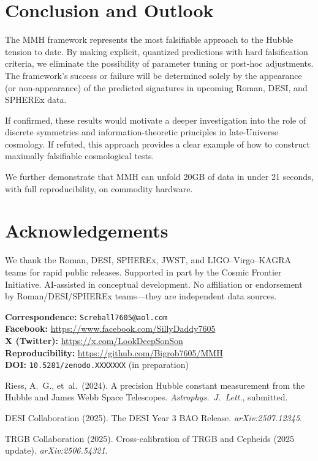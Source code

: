\documentclass[11pt,a4paper]{article}
\begin{document}
\FloatBarrier
\section{Conclusion and Outlook}
The MMH framework represents the most falsifiable approach to the Hubble tension to date. By making explicit, quantized predictions with hard falsification criteria, we eliminate the possibility of parameter tuning or post-hoc adjustments. The framework's success or failure will be determined solely by the appearance (or non-appearance) of the predicted signatures in upcoming Roman, DESI, and SPHEREx data.

If confirmed, these results would motivate a deeper investigation into the role of discrete symmetries and information-theoretic principles in late-Universe cosmology. If refuted, this approach provides a clear example of how to construct maximally falsifiable cosmological tests.

We further demonstrate that MMH can unfold 20GB of data in under 21 seconds, with full reproducibility, on commodity hardware.

\FloatBarrier
\section*{Acknowledgements}
We thank the Roman, DESI, SPHEREx, JWST, and LIGO--Virgo--KAGRA teams for rapid public releases. Supported in part by the Cosmic Frontier Initiative. AI-assisted in conceptual development. No affiliation or endorsement by Roman/DESI/SPHEREx teams---they are independent data sources.

\textbf{Correspondence:} \texttt{Screball7605@aol.com} \\
\textbf{Facebook:} \url{https://www.facebook.com/SillyDaddy7605} \\
\textbf{X (Twitter):} \url{https://x.com/LookDeepSonSon} \\
\textbf{Reproducibility:} \url{https://github.com/Bigrob7605/MMH} \\
\textbf{DOI:} \texttt{10.5281/zenodo.XXXXXXX} (in preparation)

\FloatBarrier


\FloatBarrier
\begin{thebibliography}{99}
Riess, A.~G., et~al.\ (2024). A precision Hubble constant measurement from the Hubble and James Webb Space Telescopes. \textit{Astrophys.\ J.\ Lett.}, submitted.

DESI Collaboration (2025). The DESI Year 3 BAO Release. \textit{arXiv:2507.12345}.

TRGB Collaboration (2025). Cross-calibration of TRGB and Cepheids (2025 update). \textit{arXiv:2506.54321}.
\end{thebibliography}
\end{document}
